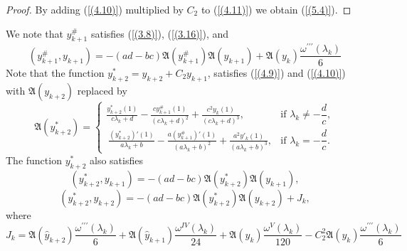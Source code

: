 \documentclass[pdflatex,sn-mathphys-num]{sn-jnl}%
\theoremstyle{thmstyleone}%
\theoremstyle{thmstyletwo}%
\theoremstyle{thmstylethree}%
\theoremstyle{definition}
\theoremstyle{remark}
\numberwithin{equation}{section}
\begin{document}
\begin{proof} By adding (\ref{(4.10)}) multiplied by $C_2$ to (\ref{(4.11)}) we obtain (\ref{(5.4)}).
\end{proof}
We note that $y^{\#}_{k+1}$ satisfies (\ref{(3.8)}), (\ref{(3.16)}), and 
\begin{equation}
(y_{k+1}^\#, y_{k+1}) =-(ad-bc)\mathfrak{A}(y_{k+1}^\#)\mathfrak{A}(y_{k+1})+\mathfrak{A}(y_{k})\frac{\omega^{\prime\prime\prime}(\lambda_k)}{6} \label{(5.5)}
\end{equation}
Note that the function \(y^{*}_{k+2}=y_{k+2}+C_{2}y_{k+1}\), satisfies (\ref{(4.9)}) and (\ref{(4.10)}) with $\mathfrak{A}(y_{k+2})$ replaced by 
\begin{equation}
   \mathfrak{A}(y^{*}_{k+2}) =
\begin{cases}
\displaystyle  
\frac{y^{*}_{k + 2}(1)}{c\lambda_{k} + d} - \frac{cy^{\#}_{k+1}(1)}{\left( c\lambda_{k} + d \right)^{2}}
+\frac{c^2y_{k}(1)}{\left( c\lambda_{k} + d \right)^{3}}, 
& \text{if } \lambda_k \neq -\dfrac{d}{c}, \\[10pt]
\displaystyle \ 
\frac{(y^{*}_{k + 2})'(1)}{a\lambda_{k} + b} - \frac{a(y^{\#}_{k+1})'(1)}{\left( a\lambda_{k} + b \right)^{2}}
+\frac{a^2y'_{k}(1)}{\left( a\lambda_{k} + b\right)^{3}}, 
& \text{if } \lambda_k = -\dfrac{d}{c}.
\end{cases} \label{(5.5.2)}
\end{equation}
The function $y^{*}_{k + 2}$ also satisfies 
\begin{equation}
(y_{k+2}^*, y_{k+1}) =-(ad-bc)\mathfrak{A}(y_{k+2}^*)\mathfrak{A}(y_{k+1}), \label{(5.6)}
\end{equation}
\begin{equation}
(y_{k+2}^*, y_{k+2}) =-(ad-bc)\mathfrak{A}(y_{k+2}^*)\mathfrak{A}(y_{k+2})+J_k, \label{(5.7)}
\end{equation}
where 
 \begin{equation}
   J_k 
    ={\mathfrak{A}(\hat{y}_{k+2})\frac{\omega^{\prime\prime\prime}(\lambda_k)}{6}+\mathfrak{A}(\hat{y}_{k+1})\frac{\omega^{IV}(\lambda_k)}{24}}+{\mathfrak{A}(y_k)\frac{\omega^{V}(\lambda_k)}{120}}-C_2^2\mathfrak{A}(y_k)\frac{\omega^{\prime\prime\prime}(\lambda_k)}{6}\label{(5.8)}
\end{equation}
\end{document}
